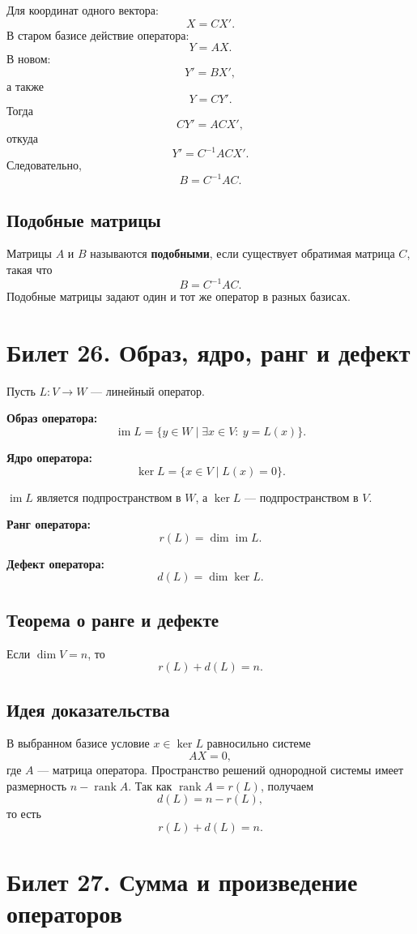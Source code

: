 \documentclass[12pt,a4paper]{article}
\DeclareMathOperator{\Ker}{ker}
\DeclareMathOperator{\Image}{im}
\DeclareMathOperator{\rank}{rank}
\begin{document}
Для координат одного вектора:
\[
    X=CX'.
\]
В старом базисе действие оператора:
\[
    Y=AX.
\]
В новом:
\[
    Y'=BX',
\]
а также
\[
    Y=CY'.
\]
Тогда
\[
    CY'=ACX',
\]
откуда
\[
    Y'=C^{-1}ACX'.
\]
Следовательно,
\[
    B=C^{-1}AC.
\]

\subsection*{Подобные матрицы}

Матрицы $A$ и $B$ называются \textbf{подобными}, если существует обратимая матрица $C$, такая что
\[
    B=C^{-1}AC.
\]
Подобные матрицы задают один и тот же оператор в разных базисах.

\section{Билет 26. Образ, ядро, ранг и дефект}

Пусть $L:V\to W$ --- линейный оператор.

\textbf{Образ оператора:}
\[
    \Image L=\{y\in W\mid \exists x\in V:\ y=L(x)\}.
\]

\textbf{Ядро оператора:}
\[
    \Ker L=\{x\in V\mid L(x)=0\}.
\]

$\Image L$ является подпространством в $W$, а $\Ker L$ --- подпространством в $V$.

\textbf{Ранг оператора:}
\[
    r(L)=\dim \Image L.
\]

\textbf{Дефект оператора:}
\[
    d(L)=\dim \Ker L.
\]

\subsection*{Теорема о ранге и дефекте}

Если $\dim V=n$, то
\[
    r(L)+d(L)=n.
\]

\subsection*{Идея доказательства}

В выбранном базисе условие $x\in\Ker L$ равносильно системе
\[
    AX=0,
\]
где $A$ --- матрица оператора. Пространство решений однородной системы имеет размерность $n-\rank A$. Так как $\rank A=r(L)$, получаем
\[
    d(L)=n-r(L),
\]
то есть
\[
    r(L)+d(L)=n.
\]

\section{Билет 27. Сумма и произведение операторов}
\end{document}
